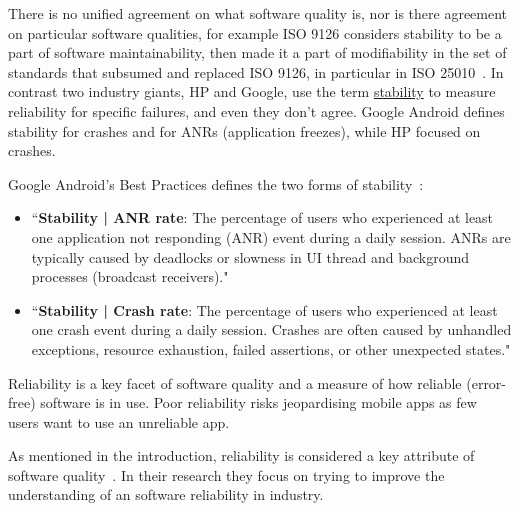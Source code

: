 
There is no unified agreement on what software quality is, nor is there agreement on particular software qualities, for example ISO 9126 considers stability to be a part of software maintainability, then made it a part of modifiability in the set of standards that subsumed and replaced ISO 9126, in particular in ISO 25010~\citep{iso25010-2011-en}. In contrast two industry giants, HP and Google, use the term \href{glossary-stability}{stability} to measure reliability for specific failures, and even they don't agree. Google Android defines stability for crashes and for ANRs (application freezes), while HP focused on crashes. 

Google Android's Best Practices defines the two forms of stability~\citep{android_vitals_best_practices_key_metrics}:
\begin{itemize}
    \item ``\textbf{Stability | ANR rate}: The percentage of users who experienced at least one application not responding (ANR) event during a daily session. ANRs are typically caused by deadlocks or slowness in UI thread and background processes (broadcast receivers)."
    \item ``\textbf{Stability | Crash rate}: The percentage of users who experienced at least one crash event during a daily session. Crashes are often caused by unhandled exceptions, resource exhaustion, failed assertions, or other unexpected states."
\end{itemize}

Reliability is a key facet of software quality and a measure of how reliable (error-free) software is in use. Poor reliability risks jeopardising mobile apps as few users want to use an unreliable app. 

As mentioned in the introduction, reliability is considered a key attribute of software quality~\citep{febrero2017_software_reliability_as_user_perception}. In their research they focus on trying to improve the understanding of an software reliability in industry. 

